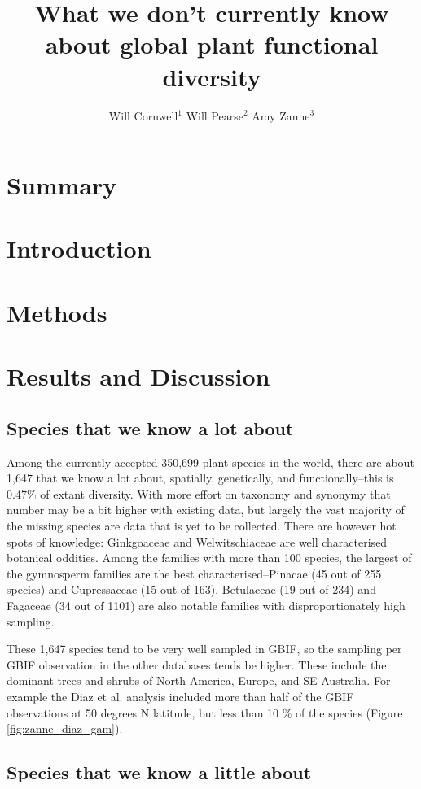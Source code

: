 \documentclass[a4paper,11pt]{article}
\title{What we don't currently know about global plant functional diversity}
\author{
Will Cornwell$^1$
Will Pearse$^2$
Amy Zanne$^3$}
\affiliation{
*final list and order undecided\\
$^1$ University of NSW\\
$^2$ somewhere between Wales and Canada?\\
$^3$ global vagabond}
\date{}
\begin{document}
\mstitlepage
\noindent

\section{Summary}


\section{Introduction}

\section{Methods}

\section{Results and Discussion}

\subsection{Species  that we know a lot about}

Among the currently accepted 350,699 plant species in the world, there are about 1,647 that we know a lot about, spatially, genetically, and functionally--this is 0.47\% of extant diversity.  With more effort on taxonomy and synonymy that number may be a bit higher with existing data, but largely the vast majority of the missing species are  data that is yet to be collected.  There are however hot spots of knowledge: Ginkgoaceae and Welwitschiaceae are well characterised botanical oddities.  Among the families with more than 100 species, the largest of the gymnosperm families are the best characterised--Pinacae (45 out of 255 species) and Cupressaceae (15 out of 163). Betulaceae (19 out of 234) and Fagaceae (34 out of 1101) are also notable families with disproportionately high sampling.  

These 1,647 species tend to be very well sampled in GBIF, so the sampling per GBIF observation in the other databases tends be higher.  These include the dominant trees and shrubs of North America, Europe, and SE Australia.  For example the Diaz et al. analysis included more than half of the GBIF observations at 50 degrees N latitude, but less than 10 \% of the species (Figure \ref{fig:zanne_diaz_gam}).

\subsection{Species that we know a little about}
\end{document}
